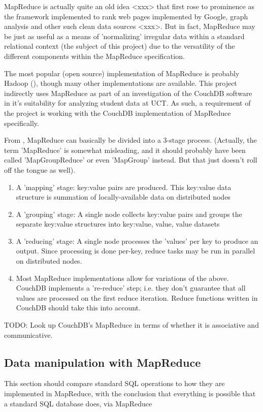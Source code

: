 MapReduce is actually quite an old idea <xxx> that first rose to prominence as the framework implemented to rank web pages implemented by Google, graph analysis and other such clean data sources <xxx>. But in fact, MapReduce may be just as useful as a means of 'normalizing' irregular data within a standard relational context (the subject of this project) due to the versatility of the different components within the MapReduce specification.

The most popular (open source) implementation of MapReduce is probably Hadoop (\cite{mining2011}), though many other implementations are available. This project indirectly uses MapReduce as part of an investigation of the CouchDB software in it's suitability for analyzing student data at UCT. As such, a requirement of the project is working with the CouchDB implementation of MapReduce specifically.

From \cite{mining2011}, MapReduce can basically be divided into a 3-stage process. (Actually, the term 'MapReduce' is somewhat misleading, and it should probably have been called 'MapGroupReduce' or even 'MapGroup' instead. But that just doesn't roll off the tongue as well).

\begin{enumerate}
    \item A 'mapping' stage: key:value pairs are produced. This key:value data structure is summation of locally-available data on distributed nodes
    \item A 'grouping' stage: A single node collects key:value pairs and groups the separate key:value structures into key:{value, value, value} datasets
    \item A 'reducing' stage: A single node processes the 'values' per key to produce an output. Since processing is done per-key, reduce tasks may be run in parallel on distributed nodes.
    \item Most MapReduce implementations allow for variations of the above. CouchDB implements a 're-reduce' step; i.e. they don't guarantee that all values are processed on the first reduce iteration. Reduce functions written in CouchDB should take this into account.
\end{enumerate}

TODO: Look up CouchDB's MapReduce in terms of whether it is associative and communicative.



\subsection{Data manipulation with MapReduce}
This section should compare standard SQL operations to how they are implemented in MapReduce, with the conclusion that everything is possible that a standard SQL database does, via MapReduce

